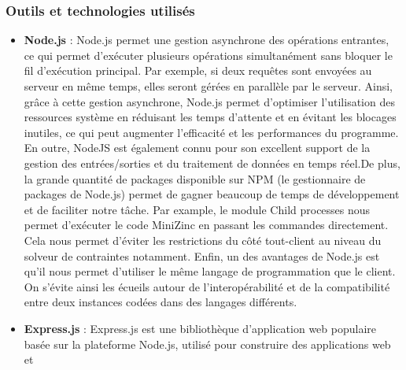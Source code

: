 \documentclass[12pt]{article}
\begin{document}
\iffalse
      \hypertarget{outils-et-technologies-utilisuxe9s-1}{%
            \subsubsection{Outils et technologies
                  utilisés}\label{outils-et-technologies-utilisuxe9s-1}}

      \begin{itemize}
            \item
                  \textbf{Node.js} \cite{Node_js} : Node.js
                  permet une gestion asynchrone des opérations entrantes, ce qui permet
                  d'exécuter plusieurs opérations simultanément sans bloquer le fil
                  d'exécution principal. Par exemple, si deux requêtes sont envoyées au
                  serveur en même temps, elles seront gérées en parallèle par le
                  serveur. Ainsi, grâce à cette gestion asynchrone, Node.js permet
                  d'optimiser l'utilisation des ressources système en réduisant les
                  temps d'attente et en évitant les blocages inutiles, ce qui peut
                  augmenter l'efficacité et les performances du programme. En outre,
                  NodeJS est également connu pour son excellent support de la gestion
                  des entrées/sorties et du traitement de données en temps
                  réel.\newline  De plus, la grande quantité de packages disponible sur
                  NPM (le gestionnaire de packages de Node.js) permet de gagner beaucoup
                  de temps de développement et de faciliter notre tâche. Par example, le
                  module Child processes
                  \cite{Child_Processes} nous permet
                  d'exécuter le code MiniZinc en passant les commandes directement. Cela
                  nous permet d'éviter les restrictions du côté tout-client au niveau du
                  solveur de contraintes notamment. Enfin, un des avantages de Node.js
                  est qu'il nous permet d'utiliser le même langage de programmation que
                  le client. On s'évite ainsi les écueils autour de l'interopérabilité
                  et de la compatibilité entre deux instances codées dans des langages
                  différents.
            \item
                  \textbf{Express.js} \cite{Express_js} :
                  Express.js est une bibliothèque d'application web populaire basée sur
                  la plateforme Node.js, utilisé pour construire des applications web et

\end{itemize}
\end{document}
